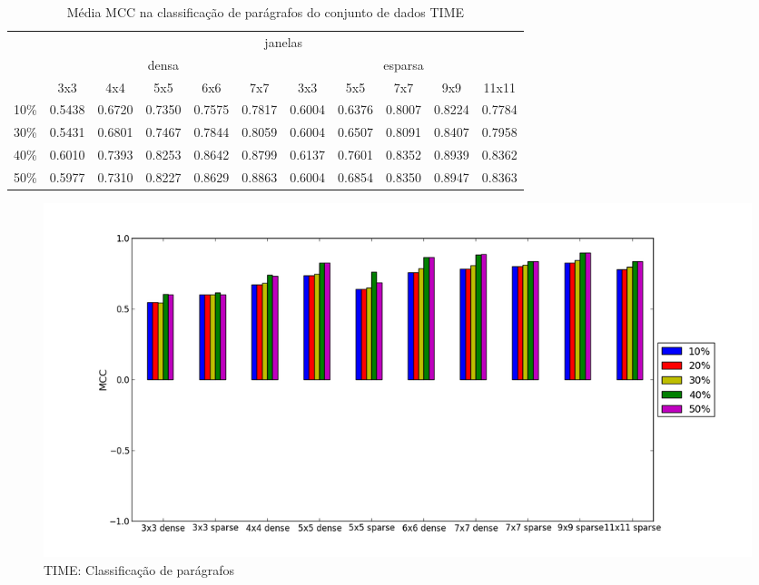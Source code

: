 \documentclass[a4paper,11pt]{article}
\begin{document}
  \begin{center}
    \begin{table}[p]
      \caption{Média MCC na classificação de parágrafos do conjunto de dados TIME}
      \begin{tabular}{ l | c c c c c || c c c c c | }
        \cline{2-11}
        & \multicolumn{10}{|c|}{janelas} \\
        \cline{2-11}
        & \multicolumn{5}{c||}{densa} & \multicolumn{5}{c|}{esparsa} \\
        \cline{2-11}
        & 3x3 & 4x4 & 5x5 & 6x6 & 7x7 & 3x3 & 5x5 & 7x7 & 9x9 & 11x11 \\
        \hline
        \multicolumn{1}{|l|}{10\%}& 0.5438& 0.6720& 0.7350& 0.7575& 0.7817& 0.6004& 0.6376& 0.8007& 0.8224& 0.7784\\
        \multicolumn{1}{|l|}{30\%}& 0.5431& 0.6801& 0.7467& 0.7844& 0.8059& 0.6004& 0.6507& 0.8091& 0.8407& 0.7958\\
        \multicolumn{1}{|l|}{40\%}& 0.6010& 0.7393& 0.8253& 0.8642& 0.8799& 0.6137& 0.7601& 0.8352& 0.8939& 0.8362\\
        \multicolumn{1}{|l|}{50\%}& 0.5977& 0.7310& 0.8227& 0.8629& 0.8863& 0.6004& 0.6854& 0.8350& 0.8947& 0.8363\\
        \hline  
      \end{tabular}
      \label{tab:time_mcc_paragraph}
    \end{table}
  \end{center}

  \begin{figure}[p]
    \centerline{\includegraphics[width=1.2\textwidth]{assets/experiment_charts/time_TextRegion_paragraph_mcc.png}}
    \caption{TIME: Classificação de parágrafos}
    \label{fig:time_TextRegion_paragraph_mcc}
  \end{figure}  
\end{document}
